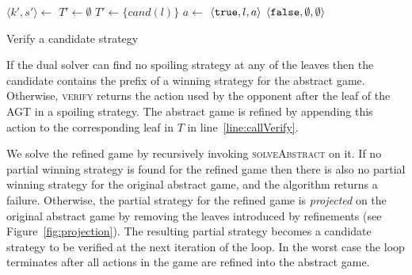 \begin{algorithm}
    \begin{algorithmic}
            \State $\langle k', s'\rangle \gets $  
             \Continue \EndIIf
                \State $T' \gets \emptyset$
            \Else
                \State $T' \gets \{ cand(l) \}$
            \EndIf
                \State $a \gets $  
                 \Return $\langle \texttt{true}, l, a \rangle$ \EndIIf {}
            \EndFor
            \State \Return $\langle \texttt{false}, \emptyset, \emptyset \rangle$ 
        \EndFunction
    \end{algorithmic}

    \caption{Verify a candidate strategy}
    \label{alg:verify}
\end{algorithm}

If the dual solver can find no spoiling strategy at any of the leaves then the candidate contains the prefix of a winning strategy for the abstract game.  Otherwise, \textsc{verify} returns the action used by the opponent after the leaf of the AGT in a spoiling strategy. The abstract game is refined by appending this action to the corresponding leaf in $T$ in line~\ref{line:callVerify}.

We solve the refined game by recursively invoking \textsc{solveAbstract} on it.  If no partial winning strategy is found for the refined game then there is also no partial winning strategy for the original abstract game, and the algorithm returns a failure.  Otherwise, the partial strategy for the refined game is \emph{projected} on the original abstract game by removing the leaves introduced by refinements (see Figure~\ref{fig:projection}). The resulting partial strategy becomes a candidate strategy to be verified at the next iteration of the loop. In the worst case the loop terminates after all actions in the game are refined into the abstract game.  

